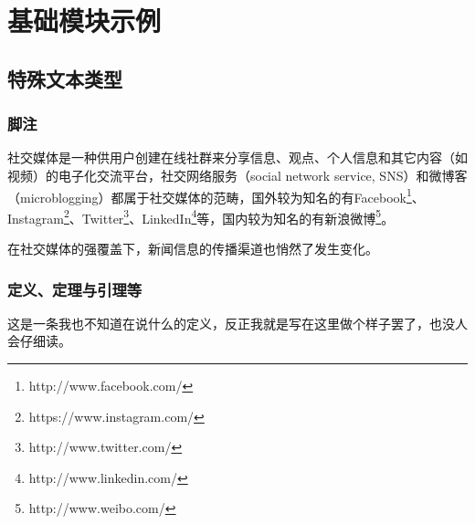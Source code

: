 \documentclass[a4paper,AutoFakeBold,oneside,12pt]{book}
\begin{document}
\blankmatter
  

\blankmatter
  

\blankmatter
  

\blankmatter
 

\frontmatter\tableofcontents %

\newpage\mainmatter
{}


\chapter{基础模块示例}


\section{特殊文本类型}
\subsection{脚注}
社交媒体是一种供用户创建在线社群来分享信息、观点、个人信息和其它内容（如视频）的电子化交流平台，社交网络服务（social network service, SNS）和微博客（microblogging）都属于社交媒体的范畴\cite{webster_social_media}，国外较为知名的有Facebook\footnote{http://www.facebook.com/}、Instagram\footnote{https://www.instagram.com/}、Twitter\footnote{http://www.twitter.com/}、LinkedIn\footnote{http://www.linkedin.com/}等，国内较为知名的有新浪微博\footnote{http://www.weibo.com/}。

在社交媒体的强覆盖下，新闻信息的传播渠道也悄然了发生变化。\cite{false_news_spread_2018}

\subsection{定义、定理与引理等}
\begin{definition}
这是一条我也不知道在说什么的定义，反正我就是写在这里做个样子罢了，也没人会仔细读。\cite{周兴2017基于深度学习的谣言检测及模式挖掘}
\end{definition}
\end{document}
